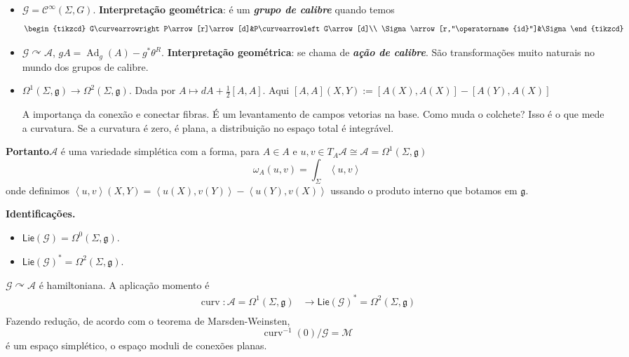 \begin{itemize}
	\item  $ \mathcal{G}=\mathcal{C}^\infty(\Sigma,G)$. \textbf{Interpretação geométrica}: é um \textit{\textbf{grupo de calibre}} quando temos
		 \[\begin{tikzcd}
			G\curvearrowright P\arrow[r]\arrow[d]&P\curvearrowleft G\arrow[d]\\
			\Sigma\arrow[r,"\operatorname{id}"]&\Sigma
		\end{tikzcd}\]

	\item $\mathcal{G}\curvearrowright \mathcal{A}$, $gA=\operatorname{Ad}_g(A)-g^*\theta^R$. \textbf{Interpretação geométrica}: se chama de \textit{\textbf{ação de calibre}}. São transformações  muito naturais no mundo dos grupos de calibre.

	\item $\Omega^{1}(\Sigma,\mathfrak{g}) \to \Omega^{2}(\Sigma,\mathfrak{g})$. Dada por  $A\mapsto dA+\frac{1}{2}[A,A]$. Aqui $[A,A](X,Y):=[A(X),A(X)]-[A(Y),A(X)]$

		\begin{remark}[Curvatura]\leavevmode
			A importança da conexão e conectar fibras. É um levantamento de campos vetorias na base. Como muda o colchete? Isso é o que mede a curvatura. Se a curvatura é zero, é plana, a distribuição no espaço total é integrável.
		\end{remark}
\end{itemize}

{\color{8}\bfseries Portanto}\hspace{.5em}$\mathcal{A}$ é uma variedade simplética com a forma, para $A\in A$ e $u,v\in T_A \mathcal{A}\cong \mathcal{A}=\Omega^{1}(\Sigma,\mathfrak{g}) $
\[\omega_A(u,v)=\int_{\Sigma}\left<u,v\right> \]
onde definimos $\left<u,v\right>(X,Y)=\left<u(X),v(Y)\right> -\left<u(Y),v(X)\right> $ ussando o produto interno que botamos em $\mathfrak{g}$.

{\color{3}\bfseries Identificações.}\hspace{.5em}
\begin{itemize}
\item $\mathsf{Lie}(\mathcal{G}) =\Omega^{0}(\Sigma,\mathfrak{g})$.
\item $\mathsf{Lie}(\mathcal{G})^* =\Omega^{2}(\Sigma,\mathfrak{g})$.
\end{itemize}

\begin{thm}\leavevmode
	$\mathcal{G}\curvearrowright \mathcal{A}$ é hamiltoniana. A aplicação momento é 
	\begin{align*}
		\operatorname{curv}: \mathcal{A}=\Omega^{1}(\Sigma,\mathfrak{g}) &\longrightarrow \mathsf{Lie}(\mathcal{G})^* =\Omega^{2}(\Sigma,\mathfrak{g}) \\
	\end{align*}
	Fazendo redução, de acordo com o teorema de Marsden-Weinsten,
	\[\operatorname{curv}^{-1}(0)\Big/\mathcal{G}=\mathcal{M}\]
	é um espaço simplético, o espaço moduli de conexões planas.
\end{thm}

